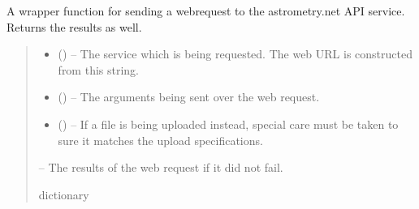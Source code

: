 \documentclass[letterpaper,11pt,english]{sphinxmanual}
\begin{document}
\begin{savenotes}
\begin{fulllineitems}
\begin{savenotes}\begin{fulllineitems}
\label{\detokenize{code/opihiexarata.astrometry.webclient:opihiexarata.astrometry.webclient.AstrometryNetWebAPIEngine._send_web_request}}
\pysigstartsignatures
{}
\pysigstopsignatures
\sphinxAtStartPar
A wrapper function for sending a webrequest to the astrometry.net API
service. Returns the results as well.
\begin{quote}\begin{description}
\begin{itemize}
\item {} 
\sphinxAtStartPar
{} () – The service which is being requested. The web URL is constructed
from this string.

\item {} 
\sphinxAtStartPar
{} (\sphinxstyleliteralemphasis{\sphinxupquote{, }}) – The arguments being sent over the web request.

\item {} 
\sphinxAtStartPar
{} (\sphinxstyleliteralemphasis{\sphinxupquote{, }}) – If a file is being uploaded instead, special care must be taken to
sure it matches the upload specifications.

\end{itemize}

\sphinxAtStartPar
{} – The results of the web request if it did not fail.

\sphinxAtStartPar
dictionary

\end{description}\end{quote}


\end{fulllineitems}
\end{savenotes}
\end{fulllineitems}
\end{savenotes}
\end{document}
